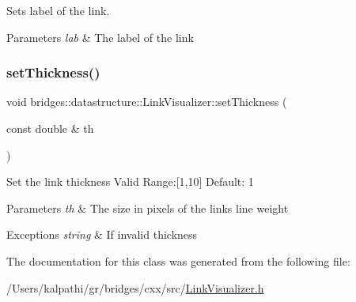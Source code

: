 Sets label of the link. 


\begin{DoxyParams}{Parameters}
{\em lab} & The label of the link \\
\hline
\end{DoxyParams}
\mbox{\label{classbridges_1_1datastructure_1_1_link_visualizer_acac8af8117ea32ccc1c3bf9843db9881}} 
\subsubsection{\texorpdfstring{setThickness()}{setThickness()}}
{\footnotesize\ttfamily void bridges\+::datastructure\+::\+Link\+Visualizer\+::set\+Thickness (\begin{DoxyParamCaption}\item[{const double \&}]{th }\end{DoxyParamCaption})\hspace{0.3cm}{\ttfamily [inline]}}

Set the link thickness Valid Range\+:\mbox{[}1,10\mbox{]} Default\+: 1


\begin{DoxyParams}{Parameters}
{\em th} & The size in pixels of the link\textquotesingle{}s line weight \\
\hline
\end{DoxyParams}

\begin{DoxyExceptions}{Exceptions}
{\em string} & If invalid thickness \\
\hline
\end{DoxyExceptions}


The documentation for this class was generated from the following file\+:\begin{DoxyCompactItemize}
\item 
/\+Users/kalpathi/gr/bridges/cxx/src/\mbox{\hyperlink{_link_visualizer_8h}{Link\+Visualizer.\+h}}\end{DoxyCompactItemize}
